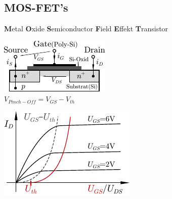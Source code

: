 \documentclass[6pt,a4paper]{scrartcl}
\begin{document}
\begin{multicols*}{3}
\section{MOS-FET's}
\textbf{M}etal \textbf{O}xide \textbf{S}emiconductor \textbf{F}ield \textbf{E}ffekt \textbf{T}ransistor\\
\parbox{4.0cm}{ \includegraphics{./img/ds/mosfet.pdf} \\ $V_{Pinch-Off} = V_{GS} - V_{th}$ } \parbox{3.0cm}{ \includegraphics{./img/ds/char_nmos.pdf} } 



\end{multicols*}
\end{document}
